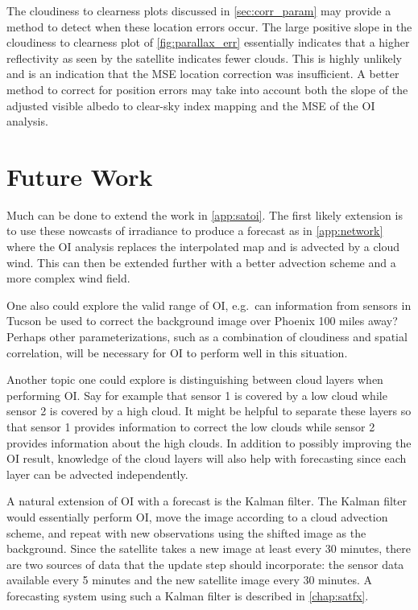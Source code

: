 The cloudiness to clearness plots discussed in \cref{sec:corr_param}
may provide a method to detect when these location errors occur.
The large positive slope in the cloudiness to clearness plot of
\cref{fig:parallax_err} essentially indicates that a higher
reflectivity as seen by the satellite indicates fewer clouds.
This is highly unlikely and is an indication that the MSE location
correction was insufficient.
A better method to correct for position errors may take into account
both the slope of the adjusted visible albedo to clear-sky index
mapping and the MSE of the OI analysis.

\section{Future Work}
Much can be done to extend the work in \cref{app:satoi}.
The first likely extension is to use these nowcasts of irradiance to
produce a forecast as in \cref{app:network} where the OI analysis
replaces the interpolated map and is advected by a cloud wind.
This can then be extended further with a better advection scheme and
a more complex wind field.

One also could explore the valid range of OI, e.g.~can information
from sensors in Tucson be used to correct the background image over
Phoenix 100 miles away?
Perhaps other parameterizations, such as a combination of cloudiness
and spatial correlation, will be necessary for OI to perform well in
this situation.

Another topic one could explore is distinguishing between cloud layers
when performing OI.
Say for example that sensor 1 is covered by a low cloud while sensor 2
is covered by a high cloud.
It might be helpful to separate these layers so that sensor 1 provides
information to correct the low clouds while sensor 2 provides
information about the high clouds.
In addition to possibly improving the OI result, knowledge of the
cloud layers will also help with forecasting since each layer can be
advected independently.

A natural extension of OI with a forecast is the Kalman filter.
The Kalman filter would essentially perform OI, move the image
according to a cloud advection scheme, and repeat with new
observations using the shifted image as the background.
Since the satellite takes a new image at least every 30 minutes, there
are two sources of data that the update step should incorporate: the
sensor data available every 5 minutes and the new satellite image
every 30 minutes.
A forecasting system using such a Kalman filter is described in
\cref{chap:satfx}.

